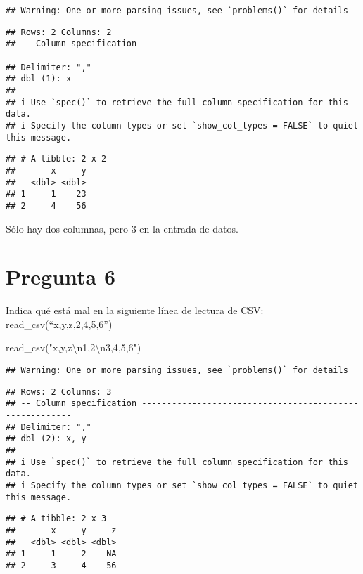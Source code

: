 \documentclass[
]{article}
\newenvironment{Shaded}{\begin{snugshade}}{\end{snugshade}}
\newcommand{\FunctionTok}[1]{\textcolor[rgb]{0.00,0.00,0.00}{#1}}
\newcommand{\NormalTok}[1]{#1}
\newcommand{\SpecialCharTok}[1]{\textcolor[rgb]{0.00,0.00,0.00}{#1}}
\newcommand{\StringTok}[1]{\textcolor[rgb]{0.31,0.60,0.02}{#1}}
\begin{document}
\begin{verbatim}
## Warning: One or more parsing issues, see `problems()` for details
\end{verbatim}

\begin{verbatim}
## Rows: 2 Columns: 2
## -- Column specification --------------------------------------------------------
## Delimiter: ","
## dbl (1): x
## 
## i Use `spec()` to retrieve the full column specification for this data.
## i Specify the column types or set `show_col_types = FALSE` to quiet this message.
\end{verbatim}

\begin{verbatim}
## # A tibble: 2 x 2
##       x     y
##   <dbl> <dbl>
## 1     1    23
## 2     4    56
\end{verbatim}

Sólo hay dos columnas, pero 3 en la entrada de datos.

\hypertarget{pregunta-6}{%
\section{Pregunta 6}\label{pregunta-6}}

Indica qué está mal en la siguiente línea de lectura de CSV:
read\_csv(``x,y,z,2,4,5,6'')

\begin{Shaded}
\begin{Highlighting}[]
\FunctionTok{read\_csv}\NormalTok{(}\StringTok{"x,y,z}\SpecialCharTok{\textbackslash{}n}\StringTok{1,2}\SpecialCharTok{\textbackslash{}n}\StringTok{3,4,5,6"}\NormalTok{)}
\end{Highlighting}
\end{Shaded}

\begin{verbatim}
## Warning: One or more parsing issues, see `problems()` for details
\end{verbatim}

\begin{verbatim}
## Rows: 2 Columns: 3
## -- Column specification --------------------------------------------------------
## Delimiter: ","
## dbl (2): x, y
## 
## i Use `spec()` to retrieve the full column specification for this data.
## i Specify the column types or set `show_col_types = FALSE` to quiet this message.
\end{verbatim}

\begin{verbatim}
## # A tibble: 2 x 3
##       x     y     z
##   <dbl> <dbl> <dbl>
## 1     1     2    NA
## 2     3     4    56
\end{verbatim}
\end{document}
